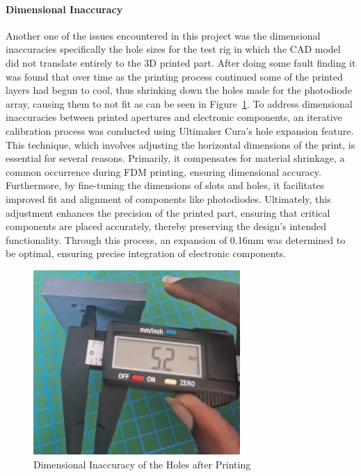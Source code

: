 \paragraph{Dimensional Inaccuracy}

Another one of the issues encountered in this project was the dimensional inaccuracies specifically the hole sizes for the test rig in which the CAD model did not translate entirely to the 3D printed part.  
After doing some fault finding it was found that over time as the printing process continued some of the printed layers had begun to cool, thus shrinking down the holes made for the photodiode array, causing them to not fit as can be seen in Figure~\ref{fig:DimInaccuracy}.  
To address dimensional inaccuracies between printed apertures and electronic components, an iterative calibration process was conducted using Ultimaker Cura's hole expansion feature. 
This technique, which involves adjusting the horizontal dimensions of the print, is essential for several reasons. 
Primarily, it compensates for material shrinkage, a common occurrence during FDM printing, ensuring dimensional accuracy. 
Furthermore, by fine-tuning the dimensions of slots and holes, it facilitates improved fit and alignment of components like photodiodes. 
Ultimately, this adjustment enhances the precision of the printed part, ensuring that critical components are placed accurately, thereby preserving the design's intended functionality. 
Through this process, an expansion of 0.16mm was determined to be optimal, ensuring precise integration of electronic components.

\begin{figure}[htbp]
    \centering
    \includegraphics[width=0.7\textwidth]{figures/CAD-3DPrint/WrongDimensions.jpg}
    \caption{Dimensional Inaccuracy of the Holes after Printing}
    \label{fig:DimInaccuracy}
    
   
    
\end{figure}
%
%

